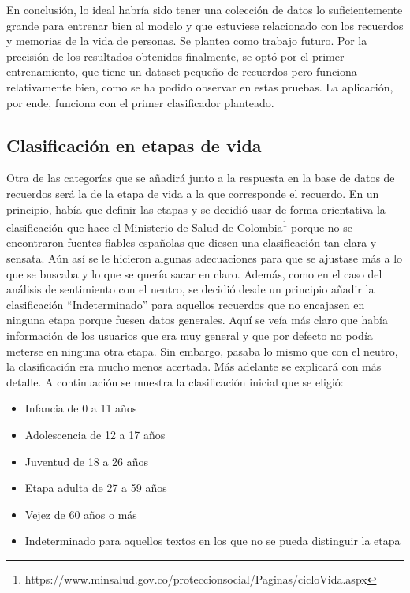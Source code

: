 En conclusión, lo ideal habría sido tener una colección de datos lo suficientemente grande para entrenar bien al modelo y que estuviese relacionado con los recuerdos y memorias de la vida de personas. Se plantea como trabajo futuro. Por la precisión de los resultados obtenidos finalmente, se optó por el primer entrenamiento, que tiene un dataset pequeño de recuerdos pero funciona relativamente bien, como se ha podido observar en estas pruebas. La aplicación, por ende, funciona con el primer clasificador planteado. 

\subsection{Clasificación en etapas de vida} \label{clasificacion_etapasvida}

Otra de las categorías que se añadirá junto a la respuesta en la base de datos de recuerdos será la de la etapa de vida a la que corresponde el recuerdo. En un principio, había que definir las etapas y se decidió usar de forma orientativa la clasificación que hace el Ministerio de Salud de Colombia\footnote{https://www.minsalud.gov.co/proteccionsocial/Paginas/cicloVida.aspx} porque no se encontraron fuentes fiables españolas que diesen una clasificación tan clara y sensata. Aún así se le hicieron algunas adecuaciones para que se ajustase más a lo que se buscaba y lo que se quería sacar en claro. Además, como en el caso del análisis de sentimiento con el neutro, se decidió desde un principio añadir la clasificación ``Indeterminado'' para aquellos recuerdos que no encajasen en ninguna etapa porque fuesen datos generales. Aquí se veía más claro que había información de los usuarios que era muy general y que por defecto no podía meterse en ninguna otra etapa. Sin embargo, pasaba lo mismo que con el neutro, la clasificación era mucho menos acertada. Más adelante se explicará con más detalle. A continuación se muestra la clasificación inicial que se eligió:

\begin{itemize}
	\item Infancia de 0 a 11 años
	\item Adolescencia de 12 a 17 años
	\item Juventud de 18 a 26 años
	\item Etapa adulta de 27 a 59 años
	\item Vejez de 60 años o más
	\item Indeterminado para aquellos textos en los que no se pueda distinguir la etapa
\end{itemize}

